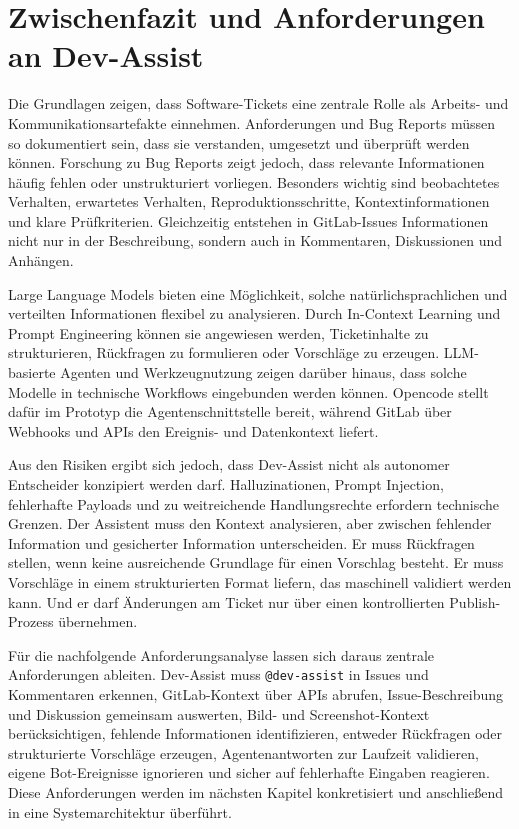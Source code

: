 \documentclass[12pt,a4paper,oneside]{scrreprt}
\begin{document}
\section{Zwischenfazit und Anforderungen an Dev-Assist}

Die Grundlagen zeigen, dass Software-Tickets eine zentrale Rolle als Arbeits- und Kommunikationsartefakte einnehmen. Anforderungen und Bug Reports müssen so dokumentiert sein, dass sie verstanden, umgesetzt und überprüft werden können. Forschung zu Bug Reports zeigt jedoch, dass relevante Informationen häufig fehlen oder unstrukturiert vorliegen. Besonders wichtig sind beobachtetes Verhalten, erwartetes Verhalten, Reproduktionsschritte, Kontextinformationen und klare Prüfkriterien. Gleichzeitig entstehen in GitLab-Issues Informationen nicht nur in der Beschreibung, sondern auch in Kommentaren, Diskussionen und Anhängen.

Large Language Models bieten eine Möglichkeit, solche natürlichsprachlichen und verteilten Informationen flexibel zu analysieren. Durch In-Context Learning und Prompt Engineering können sie angewiesen werden, Ticketinhalte zu strukturieren, Rückfragen zu formulieren oder Vorschläge zu erzeugen. LLM-basierte Agenten und Werkzeugnutzung zeigen darüber hinaus, dass solche Modelle in technische Workflows eingebunden werden können. Opencode stellt dafür im Prototyp die Agentenschnittstelle bereit, während GitLab über Webhooks und APIs den Ereignis- und Datenkontext liefert.

Aus den Risiken ergibt sich jedoch, dass Dev-Assist nicht als autonomer Entscheider konzipiert werden darf. Halluzinationen, Prompt Injection, fehlerhafte Payloads und zu weitreichende Handlungsrechte erfordern technische Grenzen. Der Assistent muss den Kontext analysieren, aber zwischen fehlender Information und gesicherter Information unterscheiden. Er muss Rückfragen stellen, wenn keine ausreichende Grundlage für einen Vorschlag besteht. Er muss Vorschläge in einem strukturierten Format liefern, das maschinell validiert werden kann. Und er darf Änderungen am Ticket nur über einen kontrollierten Publish-Prozess übernehmen.

Für die nachfolgende Anforderungsanalyse lassen sich daraus zentrale Anforderungen ableiten. Dev-Assist muss \texttt{@dev-assist} in Issues und Kommentaren erkennen, GitLab-Kontext über APIs abrufen, Issue-Beschreibung und Diskussion gemeinsam auswerten, Bild- und Screenshot-Kontext berücksichtigen, fehlende Informationen identifizieren, entweder Rückfragen oder strukturierte Vorschläge erzeugen, Agentenantworten zur Laufzeit validieren, eigene Bot-Ereignisse ignorieren und sicher auf fehlerhafte Eingaben reagieren. Diese Anforderungen werden im nächsten Kapitel konkretisiert und anschließend in eine Systemarchitektur überführt.
\end{document}
